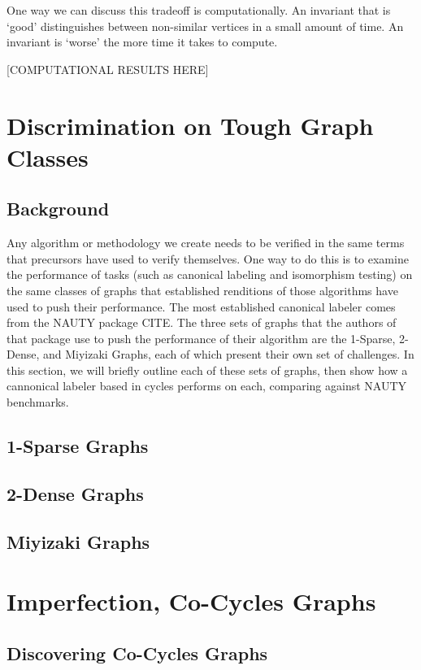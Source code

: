 \documentclass[11pt,a4paper]{report}
\begin{document}
One way we can discuss this tradeoff is computationally.
An invariant that is `good' distinguishes between non-similar vertices in a small amount of time.
An invariant is `worse' the more time it takes to compute.

[COMPUTATIONAL RESULTS HERE] 

\section{Discrimination on Tough Graph Classes}
\subsection{Background}
Any algorithm or methodology we create needs to be verified in the same terms that precursors have used to verify themselves.
One way to do this is to examine the performance of tasks (such as canonical labeling and isomorphism testing) on the same classes of graphs that established renditions of those algorithms have used to push their performance.
The most established canonical labeler comes from the NAUTY package CITE.
The three sets of graphs that the authors of that package use to push the performance of their algorithm are the 1-Sparse, 2-Dense, and Miyizaki Graphs, each of which present their own set of challenges.
In this section, we will briefly outline each of these sets of graphs, then show how a cannonical labeler based in cycles performs on each, comparing against NAUTY benchmarks.

\subsection{1-Sparse Graphs}

\subsection{2-Dense Graphs}

\subsection{Miyizaki Graphs}


\section{Imperfection, Co-Cycles Graphs}
\subsection{Discovering Co-Cycles Graphs}
\end{document}
